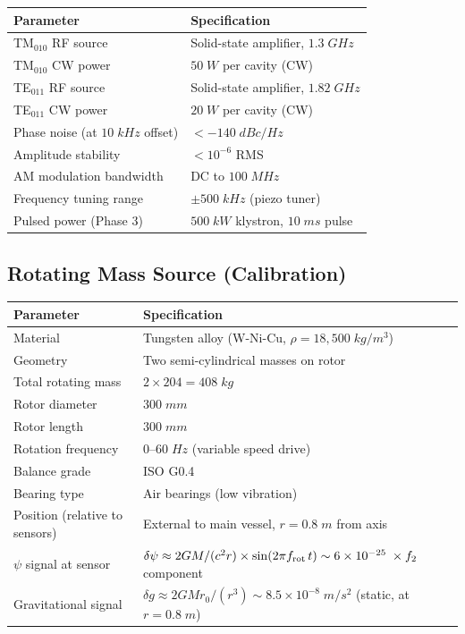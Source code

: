 \documentclass[11pt,a4paper]{article}
\begin{document}
\begin{longtable}{p{}p{}}
\toprule
\textbf{Parameter} & \textbf{Specification} \\
\midrule
\endhead
TM$_{010}$ RF source & Solid-state amplifier, $1.3\;\si{GHz}$ \\
TM$_{010}$ CW power & $50\;\si{W}$ per cavity (CW) \\
TE$_{011}$ RF source & Solid-state amplifier, $1.82\;\si{GHz}$ \\
TE$_{011}$ CW power & $20\;\si{W}$ per cavity (CW) \\
Phase noise (at $10\;\si{kHz}$ offset) & $< -140\;\si{dBc/Hz}$ \\
Amplitude stability & $< 10^{-6}$ RMS \\
AM modulation bandwidth & DC to $100\;\si{MHz}$ \\
Frequency tuning range & $\pm 500\;\si{kHz}$ (piezo tuner) \\
Pulsed power (Phase 3) & $500\;\si{kW}$ klystron, $10\;\si{ms}$ pulse \\
\bottomrule
\end{longtable}

\subsection{Rotating Mass Source (Calibration)}

\begin{longtable}{p{}p{}}
\toprule
\textbf{Parameter} & \textbf{Specification} \\
\midrule
\endhead
Material & Tungsten alloy (W-Ni-Cu, $\rho = 18{,}500\;\si{kg/m^3}$) \\
Geometry & Two semi-cylindrical masses on rotor \\
Total rotating mass & $2 \times 204 = 408\;\si{kg}$ \\
Rotor diameter & $300\;\si{mm}$ \\
Rotor length & $300\;\si{mm}$ \\
Rotation frequency & $0$--$60\;\si{Hz}$ (variable speed drive) \\
Balance grade & ISO G0.4 \\
Bearing type & Air bearings (low vibration) \\
Position (relative to sensors) & External to main vessel, $r = 0.8\;\si{m}$
from axis \\
$\psi$ signal at sensor & $\delta\psi \approx 2GM/(c^2 r)
\times \sin(2\pi f_{\rm rot}\,t) \sim 6 \times 10^{-25}\;\si{} \times f_2$
component \\
Gravitational signal & $\delta g \approx 2GM r_0/(r^3)
\sim 8.5 \times 10^{-8}\;\si{m/s^2}$ (static, at $r=0.8\;\si{m}$) \\
\bottomrule
\end{longtable}
\end{document}
